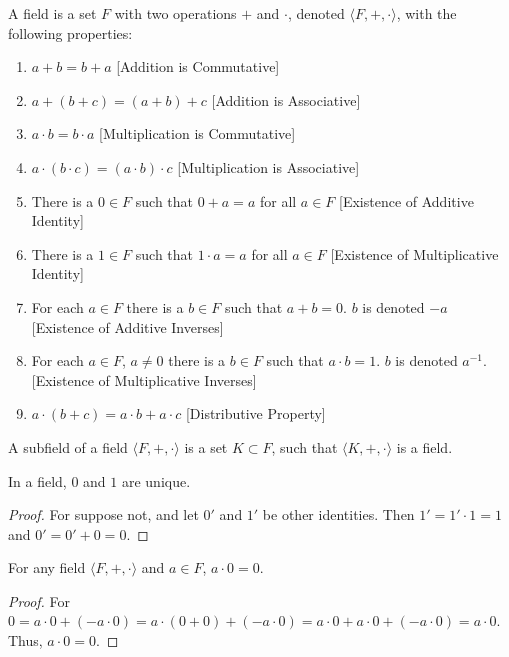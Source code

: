         \begin{definition}
        A field is a set $F$ with two operations $+$ and $\cdot$, denoted $\langle F, +,\cdot \rangle$, with the following properties:
        \begin{enumerate}
        \item $a+b=b+a$ \hfill [Addition is Commutative]
        \item $a+(b+c)=(a+b)+c$ \hfill [Addition is Associative]
        \item $a\cdot b = b\cdot a$ \hfill [Multiplication is Commutative]
        \item $a\cdot (b\cdot c) = (a\cdot b)\cdot c$ \hfill [Multiplication is Associative]
        \item There is a $0\in F$ such that $0+a=a$ for all $a\in F$ \hfill [Existence of Additive Identity]
        \item There is a $1\in F$ such that $1\cdot a = a$ for all $a\in F$ \hfill [Existence of Multiplicative Identity]
        \item For each $a\in F$ there is a $b\in F$ such that $a+b = 0$. $b$ is denoted $-a$ \hfill [Existence of Additive Inverses]
        \item For each $a\in F$, $a\ne 0$ there is a $b\in F$ such that $a\cdot b = 1$. $b$ is denoted $a^{-1}$. \hfill [Existence of Multiplicative Inverses]
        \item $a\cdot(b+c) = a\cdot b + a\cdot c$ \hfill [Distributive Property]
        \end{enumerate}
        \end{definition}
        \begin{definition}
        A subfield of a field $\langle F,+,\cdot \rangle$ is a set $K\subset F$, such that $\langle K, +,\cdot \rangle$ is a field.
        \end{definition}
        \begin{theorem}
        In a field, $0$ and $1$ are unique.
        \end{theorem}
        \begin{proof}
        For suppose not, and let $0'$ and $1'$ be other identities. Then $1'=1'\cdot 1 = 1$ and $0'=0'+0=0$.
        \end{proof}
        \begin{theorem}
        For any field $\langle{F},+,\cdot\rangle$ and $a\in{F}$,
        $a\cdot{0}=0$.
        \end{theorem}
        \begin{proof}
        For $0=a\cdot{0}+(-a\cdot 0)=a\cdot(0+0)+(-a\cdot 0)=a\cdot{0}+a\cdot 0 + (-a\cdot 0) = a\cdot 0$. Thus, $a\cdot 0 = 0$.
        \end{proof}

